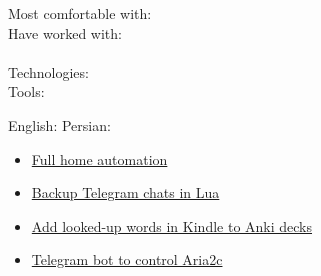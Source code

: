 Most comfortable with:   \\
Have worked with:     \\
\divider\\
Technologies:        
\divider\\
Tools:        


English: 
Persian: 



\begin{itemize}
\item {\href{https://github.com/psamim/appdaemon-apps}{Full home automation}}
\item {\href{https://github.com/psamim/telegram-cli-backup}{Backup Telegram chats in Lua}}
\item {\href{https://github.com/psamim/kindle2anki}{Add looked-up words in Kindle to Anki decks}}
\item {\href{https://github.com/psamim/aria2-telegram-bot}{Telegram bot to control Aria2c}}


\end{itemize}


